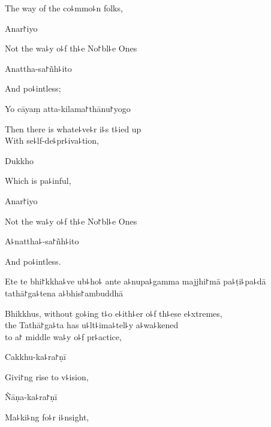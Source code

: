 \begin{english}
  The way of the co꜕mmo꜕n folks,
\end{english}

Anar꜓iyo

\begin{english}
  Not the wa꜕y o꜕f th꜕e No꜓bl꜕e Ones
\end{english}

Anattha-sa꜓ñh꜕ito

\begin{english}
  And po꜕intless;
\end{english}

Yo cāyaṃ atta-kilama꜓thānu꜓yogo

\begin{english}
  Then there is whate꜕ve꜕r i꜕s t꜕ied up\\
  With se꜕lf-de꜕pr꜕iva꜕tion,
\end{english}

Dukkho

\begin{english}
  Which is pa꜕inful,
\end{english}

Anar꜓iyo

\begin{english}
  Not the wa꜕y o꜕f th꜕e No꜓bl꜕e Ones
\end{english}

A꜕nattha꜕-sa꜓ñh꜕ito

\begin{english}
  And po꜕intless.
\end{english}

Ete te bhi꜓kkha꜕ve ub꜕ho꜕ ante a꜕nupa꜕gamma majjhi꜓mā pa꜕ṭi꜕pa꜕dā tathā꜓ga꜕tena a꜕bhis꜓ambuddhā

\begin{english}
  Bhikkhus, without go꜕ing t꜕o e꜕ith꜕er o꜕f th꜕ese e꜕xtremes,\\
  the Tathā꜓ga꜕ta has u꜕lt꜕ima꜕tel꜕y a꜕wa꜕kened\\
  to a꜓ middle wa꜕y o꜕f pr꜕actice,
\end{english}

Cakkhu-ka꜕ra꜓ṇī

\begin{english}
  Givi꜓ng rise to v꜕ision,
\end{english}

Ñāṇa-ka꜕ra꜓ṇī

\begin{english}
  Ma꜕ki꜕ng fo꜕r i꜕nsight,
\end{english}

